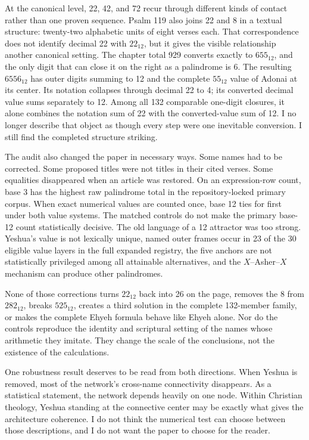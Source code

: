 At the canonical level, 22, 42, and 72 recur through different kinds of contact rather than one proven sequence. Psalm 119 also joins 22 and 8 in a textual structure: twenty-two alphabetic units of eight verses each. That correspondence does not identify decimal 22 with $22_{12}$, but it gives the visible relationship another canonical setting. The chapter total 929 converts exactly to $655_{12}$, and the only digit that can close it on the right as a palindrome is 6. The resulting $6556_{12}$ has outer digits summing to 12 and the complete $55_{12}$ value of Adonai at its center. Its notation collapses through decimal 22 to 4; its converted decimal value sums separately to 12. Among all 132 comparable one-digit closures, it alone combines the notation sum of 22 with the converted-value sum of 12. I no longer describe that object as though every step were one inevitable conversion. I still find the completed structure striking.

The audit also changed the paper in necessary ways. Some names had to be corrected. Some proposed titles were not titles in their cited verses. Some equalities disappeared when an article was restored. On an expression-row count, base 3 has the highest raw palindrome total in the repository-locked primary corpus. When exact numerical values are counted once, base 12 ties for first under both value systems. The matched controls do not make the primary base-12 count statistically decisive. The old language of a 12 attractor was too strong. Yeshua's value is not lexically unique, named outer frames occur in 23 of the 30 eligible value layers in the full expanded registry, the five anchors are not statistically privileged among all attainable alternatives, and the $X$--Asher--$X$ mechanism can produce other palindromes.

None of those corrections turns $22_{12}$ back into 26 on the page, removes the 8 from $282_{12}$, breaks $525_{12}$, creates a third solution in the complete 132-member family, or makes the complete Ehyeh formula behave like Ehyeh alone. Nor do the controls reproduce the identity and scriptural setting of the names whose arithmetic they imitate. They change the scale of the conclusions, not the existence of the calculations.

One robustness result deserves to be read from both directions. When Yeshua is removed, most of the network's cross-name connectivity disappears. As a statistical statement, the network depends heavily on one node. Within Christian theology, Yeshua standing at the connective center may be exactly what gives the architecture coherence. I do not think the numerical test can choose between those descriptions, and I do not want the paper to choose for the reader.

